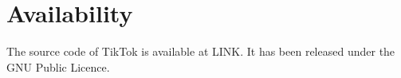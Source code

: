 \section*{Availability}

The source code of TikTok is available at LINK. It has been released under the
GNU Public Licence.






